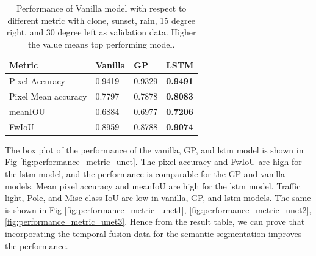 	\begin{table}
		\begin{center}
			\begin{tabular}{ | l | p{4cm} | p{4cm} | p{4cm} |}
				\hline
				
				\cellcolor{purple!30}Metric & \cellcolor{purple!30}Vanilla & \cellcolor{purple!30}GP & \cellcolor{purple!30}LSTM\\ \hline
				Pixel Accuracy & 0.9419 & 0.9329 & {\bf 0.9491} \\ \hline
				Pixel Mean accuracy & 0.7797 & 0.7878 & {\bf 0.8083}  \\ \hline
				meanIOU & 0.6884 & 0.6977 & {\bf 0.7206} \\ \hline
				FwIoU & 0.8959 & 0.8788 & {\bf 0.9074} \\ \hline
				\hline
			\end{tabular}
			\caption{Performance of Vanilla model with respect to different metric with clone, sunset, rain, 15 degree right, and 30 degree left as validation data. Higher the value means top performing model.}
			\label{table:Vanilla_conti_seq}
		\end{center}
	\end{table}
	
	The box plot of the performance of the vanilla, GP, and lstm model is shown in Fig \ref{fig:performance_metric_unet}. The pixel accuracy and  FwIoU are high for the lstm model, and the performance is comparable for the GP and vanilla models. Mean pixel accuracy and meanIoU are high for the lstm model. Traffic light, Pole, and Misc class IoU are low in vanilla, GP, and lstm models. The same is shown in Fig \ref{fig:performance_metric_unet1}, \ref{fig:performance_metric_unet2}, \ref{fig:performance_metric_unet3}. Hence from the result table, we can prove that incorporating the temporal fusion data for the semantic segmentation improves the performance. 

